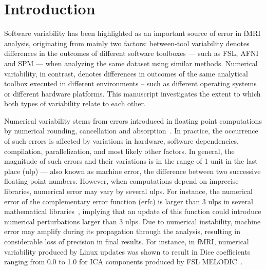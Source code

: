 \documentclass[11pt,onecolumn]{article}
\begin{document}
\section{Introduction}

Software variability has been highlighted as an important source of error
in fMRI analysis, originating from mainly two factors: between-tool
variability denotes differences in the outcomes of different
software toolboxes --- such as FSL, AFNI and SPM --- when analyzing the same dataset
using similar methods. Numerical variability, in contrast, denotes
differences in outcomes of the same analytical toolbox
executed in different environments – such as different operating systems or
different hardware platforms. This manuscript investigates the extent to
which both types of variability relate to each other.

Numerical variability stems from errors introduced in floating point
computations by numerical rounding, cancellation and absorption~\cite{muller2018handbook}. In
practice, the occurrence of such errors is affected by variations in
hardware, software dependencies, compilation, parallelization, and most
likely other factors. In general, the magnitude of such errors and their
variations is in the range of 1 unit in the last place (ulp) --- also known
as machine error, the difference between two successive floating-point
numbers. However, when computations depend on imprecise libraries,
numerical error may vary by several ulps. For instance, the numerical error
of the complementary error function (erfc) is larger than 3 ulps in several
mathematical libraries~\cite{zimmermann:hal-03141101}, implying that an update of this function could introduce
numerical perturbations larger than 3 ulps. Due to numerical instability,
machine error may amplify during its propagation through the analysis,
resulting in considerable loss of precision in final results. For instance, in fMRI,
numerical variability produced by Linux updates was shown to result in Dice
coefficients ranging from 0.0 to 1.0 for ICA components produced by FSL
MELODIC~\cite{Glatard2015}.
\end{document}
